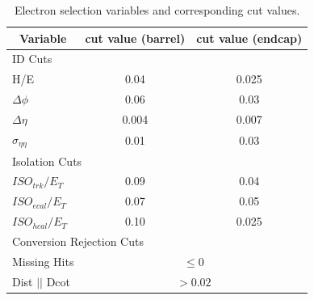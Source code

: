 \begin{table}[htbp]
  \begin{center}
    \leavevmode
    \begin{tabular}{lcc} 
      \multicolumn{1}{c}{Variable} & \multicolumn{1}{c}{cut value (barrel)}& \multicolumn{1}{c}{cut value (endcap)}\\
      \hline
      \multicolumn{3}{l}{ID Cuts}\\ 
        H/E & 0.04 & 0.025 \\
        $\Delta\phi$ & 0.06 & 0.03 \\
        $\Delta\eta$ & 0.004 & 0.007  \\
        $\sigma_{\eta\eta}$ & 0.01 & 0.03 \\ \hline
      \multicolumn{3}{l}{Isolation Cuts}\\
        $ISO_{trk} / E_T $  & 0.09 & 0.04 \\
        $ISO_{ecal}/ E_T$  & 0.07 & 0.05 \\
        $ISO_{hcal}/ E_T$  & 0.10 & 0.025 \\ \hline
       \multicolumn{3}{l}{Conversion Rejection Cuts}\\ 
        Missing Hits  & \multicolumn{2}{c|}{$\leq 0$}\\
        Dist $||$ Dcot   & \multicolumn{2}{c|}{$>0.02$}\\
    \end{tabular}
    \caption{\label{tab:elecuts} Electron selection variables and corresponding cut values.}
  \end{center}
\end{table}




